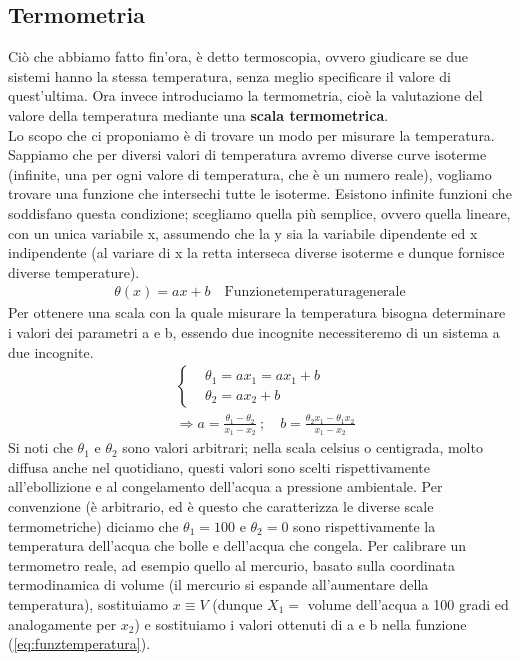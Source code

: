 \documentclass[10pt,a4paper]{article}
\begin{document}
\subsection{Termometria}
Ciò che abbiamo fatto fin'ora, è detto termoscopia, ovvero giudicare se due sistemi hanno la stessa temperatura, senza meglio specificare il valore di quest'ultima. Ora invece introduciamo la termometria, cioè la valutazione del valore della temperatura mediante una \textbf{scala termometrica}. \\
Lo scopo che ci proponiamo è di trovare un modo per misurare la temperatura. Sappiamo che per diversi valori di temperatura avremo diverse curve isoterme (infinite, una per ogni valore di temperatura, che è un numero reale), vogliamo trovare una funzione che intersechi tutte le isoterme. Esistono infinite funzioni che soddisfano questa condizione; scegliamo quella più semplice, ovvero quella lineare, con un unica variabile x, assumendo che la y sia la variabile dipendente ed x indipendente (al variare di x la retta interseca diverse isoterme e dunque fornisce diverse temperature).
\begin{align}\label{eq:funztemperatura}
	\theta (x) = a x + b \quad \text{Funzionetemperaturagenerale}
\end{align} 
Per ottenere una scala con la quale misurare la temperatura bisogna determinare i valori dei parametri a e b, essendo due incognite necessiteremo di un sistema a due incognite. 
\begin{align*}
&\begin{cases}
	&\theta_1 = a x_1 = a x_1 + b\\
	&\theta_2 = a x_2 + b  
\end{cases}\\
&\Rightarrow a = \frac{\theta_1 - \theta_2}{x_1 - x_2}\ ; \quad b = \frac{\theta_2 x_1 - \theta_1 x_2}{x_1 - x_2 }
\end{align*}
Si noti che $\theta_1$ e $\theta_2$ sono valori arbitrari; nella scala celsius o centigrada, molto diffusa anche nel quotidiano, questi valori sono scelti rispettivamente all'ebollizione e al congelamento dell'acqua a pressione ambientale. Per convenzione (è arbitrario, ed è questo che caratterizza le diverse scale termometriche) diciamo che $\theta_1 = 100$ e $\theta_2 = 0$ sono rispettivamente la temperatura dell'acqua che bolle e dell'acqua che congela. Per calibrare un termometro reale, ad esempio quello al mercurio, basato sulla coordinata termodinamica di volume (il mercurio si espande all'aumentare della temperatura), sostituiamo $x \equiv V$ (dunque $X_1=$ volume dell'acqua a 100 gradi ed analogamente per $x_2$) e sostituiamo i valori ottenuti di a e b nella funzione (\ref{eq:funztemperatura}).
\end{document}
